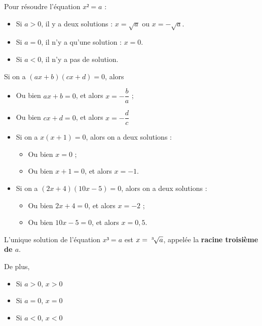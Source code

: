 \documentclass[
	classe=$1^{ere}STI2D$,
]{coursclass}
\begin{document}
\begin{propriete}
	Pour résoudre l'équation $x² = a$ :
	\begin{itemize}
		\item Si $a > 0$, il y a deux solutions : $x = \sqrt{a}$ ou $x = -\sqrt{a}$.
		\item Si $a = 0$, il n'y a qu'une solution : $x = 0$.
		\item Si $a < 0$, il n'y a pas de solution.
	\end{itemize}
\end{propriete}

\begin{propriete}
	Si on a $(ax + b)(cx + d) = 0$, alors
	\begin{itemize}
		\item Ou bien $ax + b = 0$, et alors $x = -\dfrac{b}{a}$ ;
		\item Ou bien $cx + d = 0$, et alors $x = -\dfrac{d}{c}$
	\end{itemize}
\end{propriete}

\begin{exemple}
	\begin{itemize}
		\item Si on a $x(x + 1) = 0$, alors on a deux solutions :
		      \begin{itemize}
			      \item Ou bien $x = 0$ ;
			      \item Ou bien $x + 1 = 0$, et alors $x = -1$.
		      \end{itemize}
		\item Si on a $(2x + 4)(10x - 5) = 0$, alors on a deux solutions :
		      \begin{itemize}
			      \item Ou bien $2x + 4 = 0$, et alors $x = -2$ ;
			      \item Ou bien $10x - 5 = 0$, et alors $x = 0,5$.
		      \end{itemize}
	\end{itemize}
\end{exemple}

\begin{propriete}
	L'unique solution de l'équation $x³ = a$ est $x = \sqrt[3\hspace{0.5em}]{a}$, appelée la \textbf{racine troisième de $a$}.

	De plus,
	\begin{itemize}
		\item Si $a > 0$, $x > 0$
		\item Si $a = 0$, $x = 0$
		\item Si $a < 0$, $x < 0$
	\end{itemize}
\end{propriete}
\end{document}
